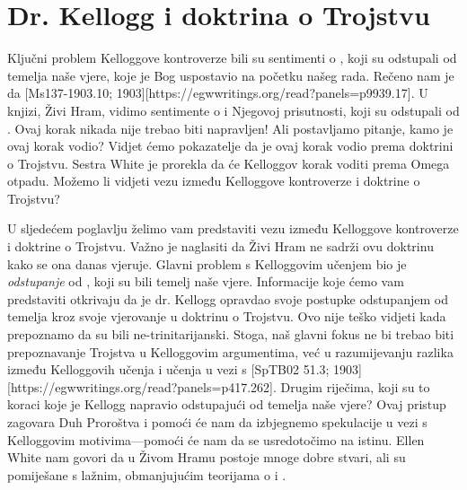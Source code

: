 \chapter{Dr. Kellogg i doktrina o Trojstvu}

Ključni problem Kelloggove kontroverze bili su sentimenti o , koji su odstupali od temelja naše vjere, koje je Bog uspostavio na početku našeg rada. Rečeno nam je da [Ms137-1903.10; 1903][https://egwwritings.org/read?panels=p9939.17]. U knjizi, Živi Hram, vidimo sentimente o  i Njegovoj prisutnosti, koji su odstupali od . Ovaj korak nikada nije trebao biti napravljen! Ali postavljamo pitanje, kamo je ovaj korak vodio? Vidjet ćemo pokazatelje da je ovaj korak vodio prema doktrini o Trojstvu. Sestra White je prorekla da će Kelloggov korak voditi prema Omega otpadu. Možemo li vidjeti vezu između Kelloggove kontroverze i doktrine o Trojstvu?

U sljedećem poglavlju želimo vam predstaviti vezu između Kelloggove kontroverze i doktrine o Trojstvu. Važno je naglasiti da Živi Hram ne sadrži ovu doktrinu kako se ona danas vjeruje. Glavni problem s Kelloggovim učenjem bio je \textit{odstupanje} od , koji su bili temelj naše vjere. Informacije koje ćemo vam predstaviti otkrivaju da je dr. Kellogg opravdao svoje postupke odstupanjem od temelja kroz svoje vjerovanje u doktrinu o Trojstvu. Ovo nije teško vidjeti kada prepoznamo da su  bili ne-trinitarijanski. Stoga, naš glavni fokus ne bi trebao biti prepoznavanje Trojstva u Kelloggovim argumentima, već u razumijevanju razlika između Kelloggovih učenja i učenja  u vezi s [SpTB02 51.3; 1903][https://egwwritings.org/read?panels=p417.262]. Drugim riječima, koji su to koraci koje je Kellogg napravio odstupajući od temelja naše vjere? Ovaj pristup zagovara Duh Proroštva i pomoći će nam da izbjegnemo spekulacije u vezi s Kelloggovim motivima—pomoći će nam da se usredotočimo na istinu. Ellen White nam govori da u Živom Hramu postoje mnoge dobre stvari, ali su pomiješane s lažnim, obmanjujućim teorijama o  i .

